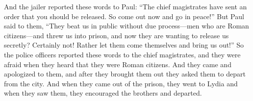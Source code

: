 \begin{biblechapter}
\verse And the jailer reported these words to Paul: “The chief magistrates have sent an order that you should be released. So come out now and go in peace!”
\verse But Paul said to them, “They beat us in public without due process—men who are Roman citizens—and threw us into prison, and now they are wanting to release us secretly? Certainly not! Rather let them come themselves and bring us out!”
\verse So the police officers reported these words to the chief magistrates, and they were afraid when they heard that they were Roman citizens.
\verse And they came and apologized to them, and after they brought them out they asked them to depart from the city.
\verse And when they came out of the prison, they went to Lydia and when they saw them, they encouraged the brothers and departed.
\end{biblechapter}

